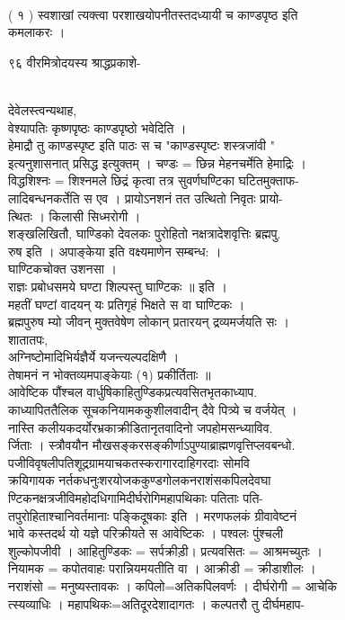 \documentclass[11pt, openany]{book}
\begin{document}
{{{{{%

{\\
( १ ) स्वशाखां त्यक्त्वा परशाखयोपनीतस्तदध्यायी च काण्डपृष्ठ इति\\
कमलाकरः ।

{९६ }{ वीरमित्रोदयस्य श्राद्धप्रकाशे-}{\\
देवेलस्त्वन्यथाह,\\
वेश्यापतिः कृष्णपृष्ठः काण्डपृष्ठो भवेदिति ।\\
हेमाद्रौ तु काण्डस्पृष्ट इति पाठः स च "काण्डस्पृष्टः शस्त्रजांवी "\\
इत्यनुशासनात् प्रसिद्ध इत्युक्तम् । चण्डः = छिन्न मेहनचर्मेति हेमाद्रिः
।\\
विद्धशिश्नः = शिश्नमले छिद्रं कृत्वा तत्र सुवर्णघण्टिका घटितमुक्ताफ-\\
लादिबन्धनकर्तेति स एव । प्रायोऽनशनं तत उत्थितो निवृतः प्रायो-\\
त्थितः । किलासी सिध्मरोगी ।\\
शङ्खलिखितौ, घाण्डिको देवलकः पुरोहितो नक्षत्रादेशवृत्तिः ब्रह्मपु.\\
रुष इति । अपाङ्केया इति वक्ष्यमाणेन सम्बन्ध: ।\\
घाण्टिकचोक्त उशनसा ।\\
राज्ञः प्रबोधसमये घण्टा शिल्पस्तु घाण्टिकः ॥ इति ।\\
महतीं घण्टां वादयन् यः प्रतिगृहं भिक्षते स वा घाण्टिकः ।\\
ब्रह्मपुरुष म्यो जीवन् मुक्तवेषेण लोकान् प्रतारयन् द्रव्यमर्जयति सः ।\\
शातातपः,\\
अग्निष्टोमादिभिर्यज्ञैर्ये यजन्त्यल्पदक्षिणै ।\\
तेषामनं न भोक्तव्यमपाङ्केयाः (१) प्रकीर्तिताः ॥\\
आवेष्टिक पौंश्चल वार्धुषिकाहितुण्डिकप्रत्यवसितभृतकाध्याप.\\
काध्यापिततैलिक सूचकनियामककुशीलवादीन् दैवे पित्र्ये च वर्जयेत् ।\\
नास्ति कलीयकदर्योरभ्रकाक्रीडितानृतवादिनो जपहोमसन्ध्याविव.\\
र्जिताः । स्त्रौवयौन मौखसङ्करसङ्कीर्णाऽपुण्याब्राह्मणवृत्तिप्लवबन्धो.\\
पजीविवृषलीपतिशूद्रग्रामयाचकतस्करागारदाहिगरदाः सोमवि\\
क्रयिगायक नर्तकधनुःशरयोजककुण्डगोलकनराशंसकपिलदेवघा\\
ण्टिकनक्षत्रजीविमहोदधिगामिदीर्घरोगिमहापथिकाः पतिताः पति-\\
तपुरोहिताश्चानिवर्तमानाः पङ्किदूषकाः इति । मरणफलकं ग्रीवावेष्टनं\\
भावे कस्तदर्थ यो यज्ञे परिक्रीयते स आवेष्टिकः । पश्वलः पुंश्चली\\
शुल्कोपजीवी । आहितुण्डिकः = सर्पक्रीड़ी। प्रत्यवसितः = आश्रमच्युतः ।\\
नियामक = कपोतवाहः परान्नियमयतीति वा । आक्रीडी = क्रीडाशीलः ।\\
नराशंसो = मनुष्यस्तावकः । कपिलो=अतिकपिलवर्णः । दीर्घरोगी = आचेकि\\
त्स्यव्याधिः । महापथिकः=अतिदूरदेशादागतः । कल्पतरौ तु दीर्घमहाप-

}}}}}}}
\end{document}
